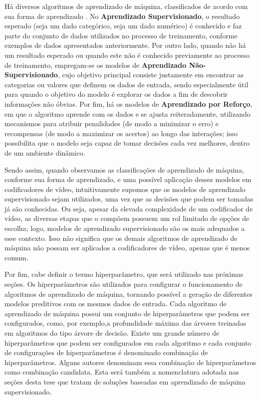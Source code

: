 Há diversos algoritmos de aprendizado de máquina, classificados de acordo com sua forma de aprendizado \cite{bib:livroML} \cite{bib:livroKubat}. No \textbf{Aprendizado Supervisionado}, o resultado esperado (seja um dado categórico, seja um dado numérico) é conhecido e faz parte do conjunto de dados utilizados no processo de treinamento, conforme exemplos de dados apresentados anteriormente. Por outro lado, quando não há um resultado esperado ou quando este não é conhecido previamente ao processo de treinamento, empregam-se os modelos de \textbf{Aprendizado Não-Supervisionado}, cujo objetivo principal consiste justamente em encontrar as categorias ou valores que definem os dados de entrada, sendo especialmente útil para quando o objetivo do modelo é explorar os dados a fim de descobrir informações não óbvias. Por fim, há os modelos de \textbf{Aprendizado por Reforço}, em que o algoritmo aprende com os dados e se ajusta reiteradamente, utilizando mecanismos para atribuir penalidades (de modo a minimizar o erro) e recompensas (de modo a maximizar os acertos) ao longo das interações; isso possibilita que o modelo seja capaz de tomar decisões cada vez melhores, dentro de um ambiente dinâmico.

Sendo assim, quando observamos as classificações de aprendizado de máquina, conforme sua forma de aprendizado, e uma possível aplicação desses modelos em codificadores de vídeo, intuitivamente supomos que os modelos de aprendizado supervisionado sejam utilizados, uma vez que as decisões que podem ser tomadas já são conhecidas. Ou seja, apesar da elevada complexidade de um codificador de vídeo, as diversas etapas que o compõem possuem um rol limitado de opções de escolha; logo, modelos de aprendizado supervisionado são os mais adequados a esse contexto. Isso não significa que os demais algoritmos de aprendizado de máquina não possam ser aplicados a codificadores de vídeo, apenas que é menos comum.

Por fim, cabe definir o termo hiperparâmetro, que será utilizado nas próximas seções. Os hiperparâmetros são utilizados para configurar o funcionamento de algoritmos de aprendizado de máquina, tornando possível a geração de diferentes modelos preditivos com os mesmos dados de entrada. Cada algoritmo de aprendizado de máquina possui um conjunto de hiperparâmetros que podem ser configurados, como, por exemplo,a profundidade máxima das árvores treinadas em algoritmos do tipo árvore de decisão. Existe um grande número de hiperparâmetros que podem ser configurados em cada algoritmo e cada conjunto de configurações de hiperparâmetros é denominado combinação de hiperparâmetros. Alguns autores denominam essa combinação de hiperparâmetros como combinação candidata. Esta será também a nomenclatura adotada nas seções desta tese que tratam de soluções baseadas em aprendizado de máquina supervisionado.
